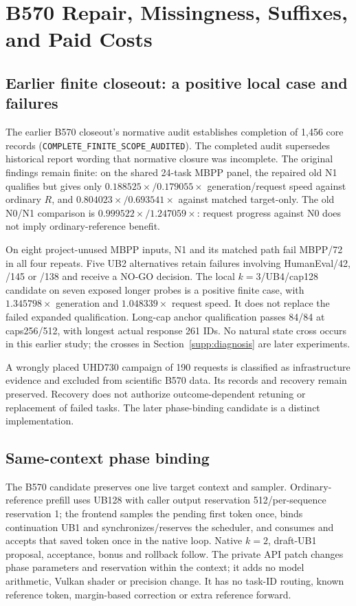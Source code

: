 \section{B570 Repair, Missingness, Suffixes, and Paid Costs}
\label{supp:b570}
\subsection{Earlier finite closeout: a positive local case and failures}
\label{supp:b570_old_closeout}
The earlier B570 closeout's normative audit establishes completion of 1,456 core records (\texttt{COMPLETE\_FINITE\_SCOPE\_AUDITED}). The completed audit supersedes historical report wording that normative closure was incomplete. The original findings remain finite: on the shared 24-task MBPP panel, the repaired old N1 qualifies but gives only $0.188525\times/0.179055\times$ generation/request speed against ordinary $R$, and $0.804023\times/0.693541\times$ against matched target-only. The old N0/N1 comparison is $0.999522\times/1.247059\times$: request progress against N0 does not imply ordinary-reference benefit.

On eight project-unused MBPP inputs, N1 and its matched path fail MBPP/72 in all four repeats. Five UB2 alternatives retain failures involving HumanEval/42, /145 or /138 and receive a NO-GO decision. The local $k=3$/UB4/cap128 candidate on seven exposed longer probes is a positive finite case, with $1.345798\times$ generation and $1.048339\times$ request speed. It does not replace the failed expanded qualification. Long-cap anchor qualification passes 84/84 at caps256/512, with longest actual response 261 IDs. No natural state cross occurs in this earlier study; the crosses in Section~\ref{supp:diagnosis} are later experiments.

A wrongly placed UHD730 campaign of 190 requests is classified as infrastructure evidence and excluded from scientific B570 data. Its records and recovery remain preserved. Recovery does not authorize outcome-dependent retuning or replacement of failed tasks. The later phase-binding candidate is a distinct implementation.

\subsection{Same-context phase binding}
\label{supp:b570_phase_binding}
The B570 candidate preserves one live target context and sampler. Ordinary-reference prefill uses UB128 with caller output reservation 512/per-sequence reservation 1; the frontend samples the pending first token once, binds continuation UB1 and synchronizes/reserves the scheduler, and consumes and accepts that saved token once in the native loop. Native $k=2$, draft-UB1 proposal, acceptance, bonus and rollback follow. The private API patch changes phase parameters and reservation within the context; it adds no model arithmetic, Vulkan shader or precision change. It has no task-ID routing, known reference token, margin-based correction or extra reference forward.

